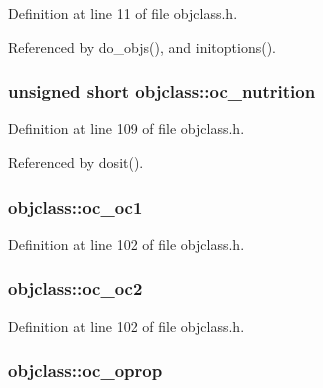 Definition at line 11 of file objclass.\+h.



Referenced by do\+\_\+objs(), and initoptions().

\hypertarget{structobjclass_a1c4aaf256145aed97ad16cc00d1ee7dd}{
\subsubsection[{oc\+\_\+nutrition}]{\setlength{\rightskip}{0pt plus 5cm}unsigned short objclass\+::oc\+\_\+nutrition}}\label{structobjclass_a1c4aaf256145aed97ad16cc00d1ee7dd}


Definition at line 109 of file objclass.\+h.



Referenced by dosit().

\hypertarget{structobjclass_a178ccb90cab344e173f04fa0def67525}{
\subsubsection[{oc\+\_\+oc1}]{ objclass\+::oc\+\_\+oc1}}\label{structobjclass_a178ccb90cab344e173f04fa0def67525}


Definition at line 102 of file objclass.\+h.

\hypertarget{structobjclass_a3eae455af5b64e4300899f46c39eee3a}{
\subsubsection[{oc\+\_\+oc2}]{ objclass\+::oc\+\_\+oc2}}\label{structobjclass_a3eae455af5b64e4300899f46c39eee3a}


Definition at line 102 of file objclass.\+h.

\hypertarget{structobjclass_a3a6ca47a71d5a816b8661d90442baf46}{
\subsubsection[{oc\+\_\+oprop}]{ objclass\+::oc\+\_\+oprop}}\label{structobjclass_a3a6ca47a71d5a816b8661d90442baf46}


